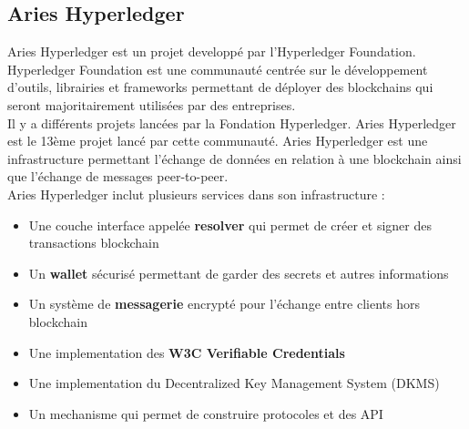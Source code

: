 \documentclass[12pt, openany]{report}
\begin{document}
\subsection{Aries Hyperledger}
\noindent 
\begin{flushleft}
Aries Hyperledger est un projet developpé par l'Hyperledger Foundation. Hyperledger Foundation est une communauté centrée sur le développement d'outils, librairies et frameworks permettant de déployer des blockchains qui seront majoritairement utilisées par des entreprises. \\
Il y a différents projets lancées par la Fondation Hyperledger. Aries Hyperledger est le 13ème projet lancé par cette communauté. Aries Hyperledger est une infrastructure permettant l'échange de données en relation à une blockchain ainsi que l'échange de messages peer-to-peer. \\
\vspace{2mm}
Aries Hyperledger inclut plusieurs services dans son infrastructure :
\begin{itemize}
\item Une couche interface appelée \textbf{resolver} qui permet de créer et signer des transactions blockchain
\item Un \textbf{wallet} sécurisé permettant de garder des secrets et autres informations 
\item Un système de \textbf{messagerie} encrypté pour l'échange entre clients hors blockchain
\item Une implementation des \textbf{W3C Verifiable Credentials} 
\item Une implementation du Decentralized Key Management System (DKMS)
\item Un mechanisme qui permet de construire protocoles et des API


\end{itemize}
\end{flushleft}
\end{document}
